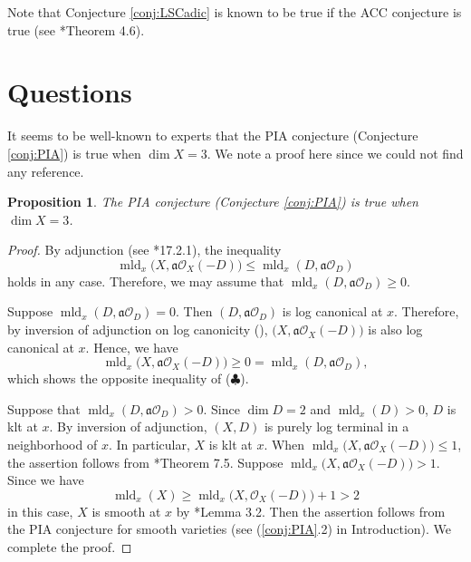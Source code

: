 \documentclass[a4paper,11pt]{amsart}
\newtheorem{prop}[thm]{Proposition}
\theoremstyle{definition}
\theoremstyle{remark}
\begin{document}
\noindent
Note that Conjecture \ref{conj:LSCadic} is known to be true if the ACC conjecture is true (see \cite{Kaw21}*{Theorem 4.6}). 


\section{Questions}\label{section:Q}

It seems to be well-known to experts that the PIA conjecture (Conjecture \ref{conj:PIA}) is true when $\dim X = 3$.
We note a proof here since we could not find any reference.

\begin{prop}\label{prop:dim3}
The PIA conjecture (Conjecture \ref{conj:PIA}) is true when $\dim X =3$. 
\end{prop}
\begin{proof}
By adjunction (see \cite{92}*{17.2.1}), the inequality 
\[
\operatorname{mld}_x \bigl( X, \mathfrak{a} \mathcal{O}_X(-D) \bigr) \le \operatorname{mld}_x (D, \mathfrak{a} \mathcal{O}_D)
\tag{$\clubsuit$}
\]
holds in any case. 
Therefore, we may assume that $\operatorname{mld}_x (D, \mathfrak{a} \mathcal{O}_D) \ge 0$. 

Suppose $\operatorname{mld}_x (D, \mathfrak{a} \mathcal{O}_D) = 0$. 
Then $(D, \mathfrak{a} \mathcal{O}_D)$ is log canonical at $x$. 
Therefore, by inversion of adjunction on log canonicity (\cite{Kaw07}), 
$\bigl( X, \mathfrak{a} \mathcal{O}_X(-D) \bigr)$ is also log canonical at $x$. 
Hence, we have 
\[
\operatorname{mld}_x \bigl( X, \mathfrak{a} \mathcal{O}_X(-D) \bigr) \ge 0 = \operatorname{mld}_x (D, \mathfrak{a} \mathcal{O}_D), 
\]
which shows the opposite inequality of ($\clubsuit$). 

Suppose that $\operatorname{mld}_x (D, \mathfrak{a} \mathcal{O}_D)>0$. 
Since $\dim D = 2$ and $\operatorname{mld}_x (D) > 0$, $D$ is klt at $x$.
By inversion of adjunction, $(X,D)$ is purely log terminal in a neighborhood of $x$. 
In particular, $X$ is klt at $x$. 
When $\operatorname{mld}_x \bigl( X, \mathfrak{a} \mathcal{O}_X(-D) \bigr) \le 1$, 
the assertion follows from \cite{Kaw21}*{Theorem 7.5}. 
Suppose $\operatorname{mld}_x \bigl( X, \mathfrak{a} \mathcal{O}_X(-D) \bigr) > 1$. 
Since we have 
\[
\operatorname{mld}_x (X) \ge \operatorname{mld}_x \bigl( X, \mathcal{O}_X (-D) \bigr) + 1 > 2 
\]
in this case, $X$ is smooth at $x$ by \cite{Amb99}*{Lemma 3.2}.
Then the assertion follows from the PIA conjecture for smooth varieties (see (\ref{conj:PIA}.2) in Introduction).
We complete the proof. 
\end{proof}
\end{document}
